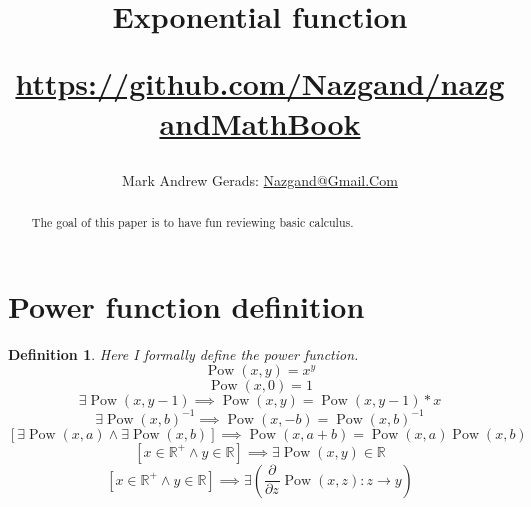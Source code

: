 \documentclass[]{article}
\author{Mark Andrew Gerads: \href{MailTo:Nazgand@Gmail.Com}{Nazgand@Gmail.Com}}
\title{
	Exponential function
	
	\href{https://github.com/Nazgand/nazgandMathBook}{https://github.com/Nazgand/nazgandMathBook}
}
\DeclareMathOperator{\pow}{Pow}
\newcommand{\pqty}[1]{{\left(#1\right)}}
\newcommand{\bqty}[1]{{\left[#1\right]}}
\newcommand{\pdiff}[2]{\frac{\partial^{#2}}{\partial #1^{#2}}}
\newtheorem{definition}[theorem]{Definition}
\numberwithin{equation}{section}
\begin{document}
	
	\maketitle
	
	\begin{abstract}
		The goal of this paper is to have fun reviewing basic calculus.
	\end{abstract}
	
	\section{Power function definition}
	\begin{definition}
			Here I formally define the power function.
		\begin{equation}
			\pow\pqty{x,y}=x^y
		\end{equation}
		\begin{equation}
			\pow\pqty{x,0}=1
		\end{equation}
		\begin{equation}
			\exists\pow\pqty{x,y-1}\implies\pow\pqty{x,y}=\pow\pqty{x,y-1}*x
		\end{equation}
		\begin{equation}
			{\exists\pow\pqty{x,b}^{-1}}\implies\pow\pqty{x,-b}=\pow\pqty{x,b}^{-1}
		\end{equation}
		\begin{equation}
			\bqty{\exists\pow\pqty{x,a}\land\exists\pow\pqty{x,b}}\implies\pow\pqty{x,a+b}=\pow\pqty{x,a}\pow\pqty{x,b}
		\end{equation}
		\begin{equation}
			\bqty{x\in\mathbb{R}^+ \land y\in\mathbb{R}}\implies\exists\pow\pqty{x,y}\in\mathbb{R}
		\end{equation}
		\begin{equation}
			\bqty{x\in\mathbb{R}^+\land y\in\mathbb{R}}
			\implies\exists\pqty{\pdiff{z}{}\pow\pqty{x,z}:z\to y}
		\end{equation}
	\end{definition}
	
\end{document}
